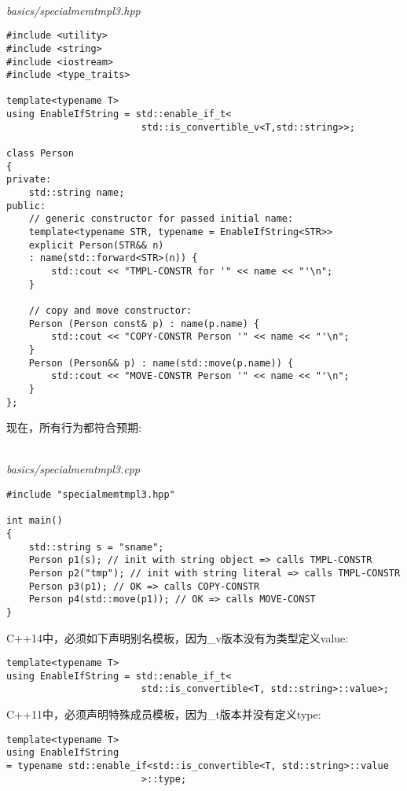 \hspace*{\fill} \\ %
\noindent
\textit{basics/specialmemtmpl3.hpp}
\begin{lstlisting}[style=styleCXX]
#include <utility>
#include <string>
#include <iostream>
#include <type_traits>

template<typename T>
using EnableIfString = std::enable_if_t<
						std::is_convertible_v<T,std::string>>;

class Person
{
private:
	std::string name;
public:
	// generic constructor for passed initial name:
	template<typename STR, typename = EnableIfString<STR>>
	explicit Person(STR&& n)
	: name(std::forward<STR>(n)) {
		std::cout << "TMPL-CONSTR for '" << name << "'\n";
	}

	// copy and move constructor:
	Person (Person const& p) : name(p.name) {
		std::cout << "COPY-CONSTR Person '" << name << "'\n";
	}
	Person (Person&& p) : name(std::move(p.name)) {
		std::cout << "MOVE-CONSTR Person '" << name << "'\n";
	}
};
\end{lstlisting}

现在，所有行为都符合预期:

\hspace*{\fill} \\ %
\noindent
\textit{basics/specialmemtmpl3.cpp}
\begin{lstlisting}[style=styleCXX]
#include "specialmemtmpl3.hpp"

int main()
{
	std::string s = "sname";
	Person p1(s); // init with string object => calls TMPL-CONSTR
	Person p2("tmp"); // init with string literal => calls TMPL-CONSTR
	Person p3(p1); // OK => calls COPY-CONSTR
	Person p4(std::move(p1)); // OK => calls MOVE-CONST
}
\end{lstlisting}

C++14中，必须如下声明别名模板，因为\_v版本没有为类型定义value:

\begin{lstlisting}[style=styleCXX]
template<typename T>
using EnableIfString = std::enable_if_t<
						std::is_convertible<T, std::string>::value>;
\end{lstlisting}

C++11中，必须声明特殊成员模板，因为\_t版本并没有定义type:

\begin{lstlisting}[style=styleCXX]
template<typename T>
using EnableIfString
= typename std::enable_if<std::is_convertible<T, std::string>::value
						>::type;
\end{lstlisting}

